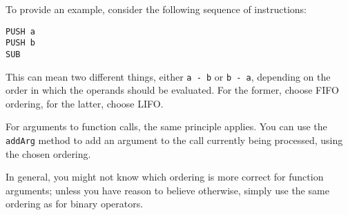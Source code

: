 To provide an example, consider the following sequence of instructions:

\begin{bytecode}
\begin{lstlisting}
PUSH a
PUSH b
SUB
\end{lstlisting}
\end{bytecode}

This can mean two different things, either \verb+a - b+ or \verb+b - a+, depending on the order in which the operands should be evaluated. For the former, choose FIFO ordering, for the latter, choose LIFO.

For arguments to function calls, the same principle applies. You can use the \verb+addArg+ method to add an argument to the call currently being processed, using the chosen ordering.

In general, you might not know which ordering is more correct for function arguments; unless you have reason to believe otherwise, simply use the same ordering as for binary operators.
